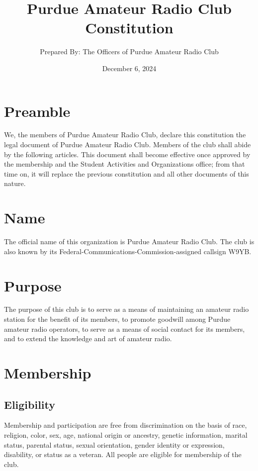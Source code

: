 \documentclass{article}
\title{Purdue Amateur Radio Club Constitution}
\author{Prepared By: The Officers of Purdue Amateur Radio Club}
\date{December 6, 2024}
\begin{document}
\maketitle \vspace{3ex}

\tableofcontents
\newpage

\setcounter{section}{-1}
\section{Preamble}

We, the members of Purdue Amateur Radio Club, declare this constitution the
legal document of Purdue Amateur Radio Club. Members of the club shall abide by
the following articles. This document shall become effective once approved by
the membership and the Student Activities and Organizations office; from that
time on, it will replace the previous constitution and all other documents of
this nature.

\section{Name}

The official name of this organization is Purdue Amateur Radio Club. The club is
also known by its Federal-Communications-Commission-assigned callsign W9YB.

\section{Purpose}

The purpose of this club is to serve as a means of maintaining an amateur radio
station for the benefit of its members, to promote goodwill among Purdue amateur
radio operators, to serve as a means of social contact for its members, and to
extend the knowledge and art of amateur radio.

\section{Membership}

\subsection{Eligibility}

Membership and participation are free from discrimination on the basis of race,
religion, color, sex, age, national origin or ancestry, genetic information,
marital status, parental status, sexual orientation, gender identity or
expression, disability, or status as a veteran. All people are eligible for
membership of the club.
\end{document}
